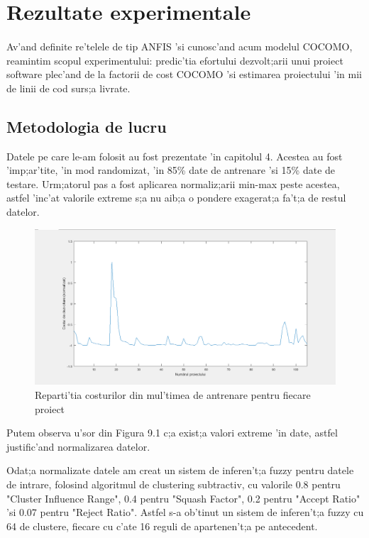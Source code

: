 \section {Rezultate experimentale}

\paragraph{}
Av'and definite re'telele de tip ANFIS 'si cunosc'and acum modelul COCOMO, reamintim scopul experimentului: predic'tia efortului dezvolt;arii unui proiect software plec'and de la factorii de cost COCOMO 'si estimarea proiectului 'in mii de linii de cod surs;a livrate. 
\par
\subsection{Metodologia de lucru}
Datele pe care le-am folosit au fost prezentate 'in capitolul 4. Acestea au fost 'imp;ar'tite, 'in mod randomizat, 'in 85\% date de antrenare 'si 15\% date de testare. Urm;atorul pas a fost aplicarea normaliz;arii min-max peste acestea, astfel 'inc'at valorile extreme s;a nu aib;a o pondere exagerat;a fa't;a de restul datelor.
\begin{figure}[!htbp]
\includegraphics[width=\textwidth]{training_cost}
\caption{Reparti'tia costurilor din mul'timea de antrenare pentru fiecare proiect}
\end{figure}
\par
Putem observa u'sor din Figura 9.1 c;a exist;a valori extreme 'in date, astfel justific'and normalizarea datelor.
\par
Odat;a normalizate datele am creat un sistem de inferen't;a fuzzy pentru datele de intrare, folosind algoritmul de clustering subtractiv, cu valorile 0.8 pentru "Cluster Influence Range", 0.4 pentru "Squash Factor", 0.2 pentru "Accept Ratio" 'si 0.07 pentru "Reject Ratio". Astfel s-a ob'tinut un sistem de inferen't;a fuzzy cu 64 de clustere, fiecare cu c'ate 16 reguli de apartenen't;a pe antecedent.
